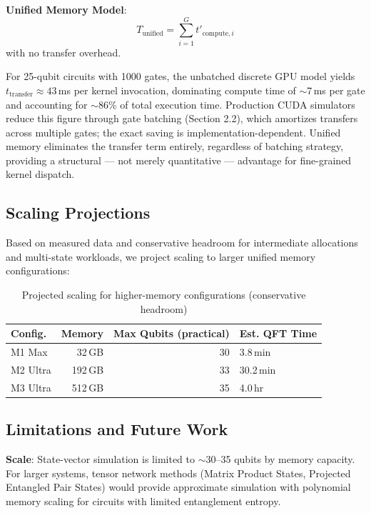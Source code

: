\documentclass[runningheads]{llncs}
\begin{document}
\textbf{Unified Memory Model}:
\begin{equation}
T_{\text{unified}} = \sum_{i=1}^{G} t'_{\text{compute},i}
\end{equation}
with no transfer overhead.

For 25-qubit circuits with 1000 gates, the unbatched discrete GPU model
yields $t_{\text{transfer}} \approx 43$\,ms per kernel invocation, dominating compute time
of $\sim$7\,ms per gate and accounting for $\sim$86\% of total execution time.
Production CUDA simulators reduce this figure through gate batching
(Section 2.2), which amortizes transfers across multiple gates; the
exact saving is implementation-dependent. Unified memory eliminates
the transfer term entirely, regardless of batching strategy, providing
a structural — not merely quantitative — advantage for fine-grained
kernel dispatch.

\subsection{Scaling Projections}

Based on measured data and conservative headroom for intermediate allocations and multi-state workloads, we project scaling to larger unified memory configurations:

\begin{table}[t]
\caption{Projected scaling for higher-memory configurations (conservative headroom)}
\label{tab:projections}
\centering
\begin{tabular}{lrrl}
\toprule
Config. & Memory & Max Qubits (practical) & Est. QFT Time \\
\midrule
M1 Max & 32\,GB & 30 & 3.8\,min \\
M2 Ultra & 192\,GB & 33 & 30.2\,min \\
M3 Ultra & 512\,GB & 35 & 4.0\,hr \\
\bottomrule
\end{tabular}
\end{table}

\subsection{Limitations and Future Work}

\textbf{Scale}: State-vector simulation is limited to $\sim$30--35 qubits by memory capacity. For larger systems, tensor network methods (Matrix Product States, Projected Entangled Pair States) would provide approximate simulation with polynomial memory scaling for circuits with limited entanglement entropy.
\end{document}
